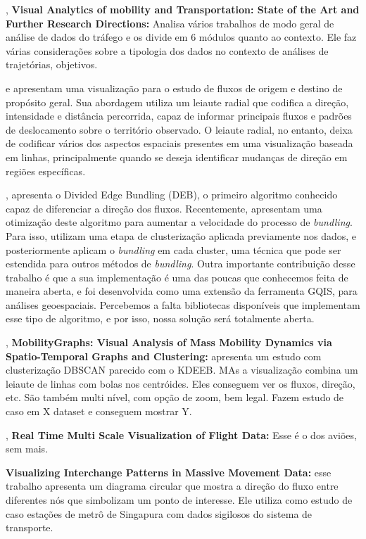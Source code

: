   \citet{Andrienko2017Visual}, \textbf{Visual Analytics of mobility and Transportation: State of the Art and
Further Research Directions:} Analisa vários trabalhos de modo geral de análise
de dados do tráfego e os divide em 6 módulos quanto ao contexto. Ele faz várias
considerações sobre a tipologia dos dados no contexto de análises de trajetórias,
objetivos. 

   \citet{Zeng2013} e \citet{Andrienko2017} apresentam uma visualização para o
estudo de fluxos de origem e destino de propósito geral. Sua abordagem utiliza
um leiaute radial que codifica a direção, intensidade e distância percorrida,
capaz de informar principais fluxos e padrões de deslocamento sobre o
território observado. O leiaute radial, no entanto, deixa de codificar vários
dos aspectos espaciais presentes em uma visualização baseada em linhas,
principalmente quando se deseja identificar mudanças de direção em regiões
específicas.

  \citet{Selassie2011}, apresenta o Divided Edge Bundling (DEB), o primeiro
algoritmo conhecido capaz de diferenciar a direção dos fluxos. Recentemente,
\citet{Anita2017} apresentam uma otimização deste algoritmo para aumentar a
velocidade do processo de \emph{bundling}. Para isso, utilizam uma etapa de
clusterização aplicada previamente nos dados, e posteriormente aplicam o
\emph{bundling} em cada cluster, uma técnica que pode ser estendida para outros
métodos de \emph{bundling}.  Outra importante contribuição desse trabalho é que
a sua implementação é uma das poucas que conhecemos feita de maneira aberta, e
foi desenvolvida como uma extensão da ferramenta GQIS, para análises
geoespaciais.  Percebemos a falta bibliotecas disponíveis que implementam esse
tipo de algoritmo, e por isso, nossa solução será totalmente aberta.

  \citet{Landersberg2016}, \textbf{MobilityGraphs: Visual Analysis of Mass Mobility Dynamics via Spatio-Temporal Graphs and Clustering:} apresenta um
estudo com clusterização DBSCAN parecido com o KDEEB. MAs a visualização combina
um leiaute de linhas com bolas nos centróides. Eles conseguem ver os fluxos,
direção, etc. São também multi nível, com opção de zoom, bem legal. Fazem estudo de caso em X dataset e conseguem mostrar Y.

  \citet{Klein2013}, \textbf{Real Time Multi Scale Visualization of Flight Data:} Esse é o dos aviões, sem mais.

  \textbf{Visualizing Interchange Patterns in Massive Movement Data:} esse
trabalho apresenta um diagrama circular que mostra a direção do fluxo entre
diferentes nós que simbolizam um ponto de interesse. Ele utiliza como estudo de
caso estações de metrô de Singapura com dados sigilosos do sistema de
transporte.

